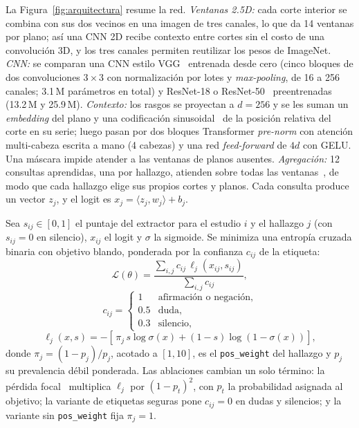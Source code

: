 \documentclass{article}
\makeatletter
\renewcommand{\subsection}{\@startsection{subsection}{2}{\z@}{-1.8ex \@plus -0.5ex \@minus -0.2ex}{0.8ex \@plus 0.2ex}{\normalsize\bfseries\raggedright}}
\makeatother
\begin{document}
La Figura~\ref{fig:arquitectura} resume la red.
\emph{Ventanas 2.5D:} cada corte interior se combina con sus dos vecinos en una imagen de tres canales, lo que da 14 ventanas por plano; así una CNN 2D recibe contexto entre cortes sin el costo de una convolución 3D, y los tres canales permiten reutilizar los pesos de ImageNet.
\emph{CNN:} se comparan una CNN estilo VGG~\cite{simonyan2015vgg} entrenada desde cero (cinco bloques de dos convoluciones $3\times3$ con normalización por lotes y \emph{max-pooling}, de 16 a 256 canales; 3.1\,M parámetros en total) y ResNet-18 o ResNet-50~\cite{he2016resnet} preentrenadas (13.2\,M y 25.9\,M).
\emph{Contexto:} los rasgos se proyectan a $d=256$ y se les suman un \emph{embedding} del plano y una codificación sinusoidal~\cite{vaswani2017attention} de la posición relativa del corte en su serie; luego pasan por dos bloques Transformer \emph{pre-norm} con atención multi-cabeza escrita a mano (4 cabezas) y una red \emph{feed-forward} de $4d$ con GELU.
Una máscara impide atender a las ventanas de planos ausentes.
\emph{Agregación:} 12 consultas aprendidas, una por hallazgo, atienden sobre todas las ventanas~\cite{ilse2018attention}, de modo que cada hallazgo elige sus propios cortes y planos.
Cada consulta produce un vector $z_j$, y el logit es $x_j=\langle z_j, w_j\rangle + b_j$.

\subsection{Formulación y función de pérdida}
\label{sec:perdida}

Sea $s_{ij}\in[0,1]$ el puntaje del extractor para el estudio $i$ y el hallazgo $j$ (con $s_{ij}=0$ en silencio), $x_{ij}$ el logit y $\sigma$ la sigmoide.
Se minimiza una entropía cruzada binaria con objetivo blando, ponderada por la confianza $c_{ij}$ de la etiqueta:
\begin{equation}
  \mathcal{L}(\theta) = \frac{\sum_{i,j} c_{ij}\,\ell_j(x_{ij}, s_{ij})}{\sum_{i,j} c_{ij}},
  \label{eq:perdida}
\end{equation}
\begin{equation}
  c_{ij} = \begin{cases} 1 & \text{afirmación o negación,} \\ 0.5 & \text{duda,} \\ 0.3 & \text{silencio,} \end{cases}
  \label{eq:confianza}
\end{equation}
\begin{equation}
  \ell_j(x, s) = -\left[\,\pi_j\, s \log\sigma(x) + (1-s)\log\left(1-\sigma(x)\right)\right],
  \label{eq:bce}
\end{equation}
donde $\pi_j=(1-p_j)/p_j$, acotado a $[1,10]$, es el \texttt{pos\_weight} del hallazgo y $p_j$ su prevalencia débil ponderada.
Las ablaciones cambian un solo término: la pérdida focal~\cite{lin2017focal} multiplica $\ell_j$ por $(1-p_t)^2$, con $p_t$ la probabilidad asignada al objetivo; la variante de etiquetas seguras pone $c_{ij}=0$ en dudas y silencios; y la variante sin \texttt{pos\_weight} fija $\pi_j=1$.
\end{document}
